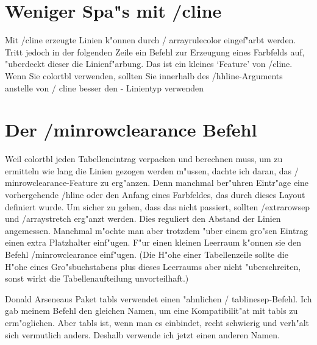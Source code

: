 \documentclass[ngerman]{article}
\begin{document}
\section{Weniger Spa"s mit \slash \textsf{cline}}

Mit  \slash \textsf{cline} erzeugte Linien k"onnen durch  \slash
\textsf{arrayrulecolor} eingef"arbt werden. Tritt jedoch in der folgenden Zeile ein Befehl zur 
Erzeugung eines Farbfelds auf, "uberdeckt dieser die Linienf"arbung. Das
ist ein kleines `Feature' von  \slash \textsf{cline}. Wenn Sie colortbl verwenden, sollten Sie 
innerhalb des  \slash \textsf{hhline}-Arguments anstelle von  \slash
\textsf{cline} besser den - Linientyp verwenden

\section{Der \slash \textsf{minrowclearance} Befehl}

Weil colortbl jeden Tabelleneintrag verpacken und berechnen muss, um zu ermitteln wie lang die 
Linien gezogen werden m"ussen, dachte ich daran, das  \slash
\textsf{minrowclearance}-Feature zu erg"anzen. Denn manchmal ber"uhren Eintr"age eine 
vorhergehende  \slash \textsf{hline} oder den Anfang eines Farbfeldes, das durch dieses Layout 
definiert wurde. Um sicher zu gehen, dass das nicht passiert, sollten
\slash \textsf{extrarowsep} und  \slash \textsf{arraystretch} erg"anzt werden. Dies reguliert den 
Abstand der Linien angemessen.  Manchmal m"ochte man aber trotzdem "uber einem gro"sen Eintrag einen
extra Platzhalter einf"ugen.  F"ur einen kleinen Leerraum k"onnen sie den
Befehl  \slash \textsf{minrowclearance} einf"ugen. (Die H"ohe einer Tabellenzeile sollte die H"ohe 
eines Gro"sbuchstabens plus dieses Leerraums aber nicht "uberschreiten, sonst wirkt die 
Tabellenaufteilung unvorteilhaft.)

Donald Arseneaus Paket \textsf{tabls} verwendet einen "ahnlichen  \slash
\textsf{tablinesep}-Befehl. Ich gab meinem Befehl den gleichen Namen, um eine Kompatibilit"at mit 
\textsf{tabls} zu erm"oglichen. Aber \textsf{tabls} ist, wenn man es einbindet, recht schwierig und 
verh"alt sich vermutlich anders. Deshalb verwende ich jetzt einen anderen Namen.
\end{document}
